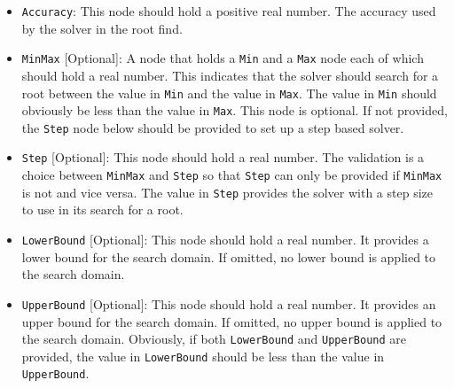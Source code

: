 \documentclass[12pt, a4paper]{article}
\begin{document}
{{\begin{itemize}
\item \lstinline!Accuracy!:
This node should hold a positive real number. The accuracy used by the solver in the root find.

\item \lstinline!MinMax! [Optional]:
A node that holds a \lstinline!Min! and a \lstinline!Max! node each of which should hold a real number. This indicates that the solver should search for a root between the value in \lstinline!Min! and the value in \lstinline!Max!. The value in \lstinline!Min! should obviously be less than the value in \lstinline!Max!. This node is optional. If not provided, the \lstinline!Step! node below should be provided to set up a step based solver.

\item \lstinline!Step! [Optional]:
This node should hold a real number. The validation is a choice between \lstinline!MinMax! and \lstinline!Step! so that \lstinline!Step! can only be provided if \lstinline!MinMax! is not and vice versa. The value in \lstinline!Step! provides the solver with a step size to use in its search for a root.

\item \lstinline!LowerBound! [Optional]:
This node should hold a real number. It provides a lower bound for the search domain. If omitted, no lower bound is applied to the search domain.

\item \lstinline!UpperBound! [Optional]:
This node should hold a real number. It provides an upper bound for the search domain. If omitted, no upper bound is applied to the search domain. Obviously, if both \lstinline!LowerBound! and \lstinline!UpperBound! are provided, the value in \lstinline!LowerBound! should be less than the value in \lstinline!UpperBound!.

\end{itemize}










}}
\end{document}
